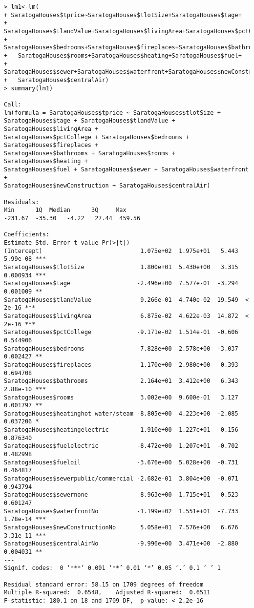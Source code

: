 \documentclass[12pt]{article}
\begin{document}
\begin{verbatim}
> lm1<-lm(
+ SaratogaHouses$tprice~SaratogaHouses$tlotSize+SaratogaHouses$tage+
+   SaratogaHouses$tlandValue+SaratogaHouses$livingArea+SaratogaHouses$pctCollege+
+   SaratogaHouses$bedrooms+SaratogaHouses$fireplaces+SaratogaHouses$bathrooms+
+   SaratogaHouses$rooms+SaratogaHouses$heating+SaratogaHouses$fuel+
+   SaratogaHouses$sewer+SaratogaHouses$waterfront+SaratogaHouses$newConstruction+
+   SaratogaHouses$centralAir)
> summary(lm1)

Call:
lm(formula = SaratogaHouses$tprice ~ SaratogaHouses$tlotSize + 
SaratogaHouses$tage + SaratogaHouses$tlandValue + SaratogaHouses$livingArea + 
SaratogaHouses$pctCollege + SaratogaHouses$bedrooms + SaratogaHouses$fireplaces + 
SaratogaHouses$bathrooms + SaratogaHouses$rooms + SaratogaHouses$heating + 
SaratogaHouses$fuel + SaratogaHouses$sewer + SaratogaHouses$waterfront + 
SaratogaHouses$newConstruction + SaratogaHouses$centralAir)

Residuals:
Min      1Q  Median      3Q     Max 
-231.67  -35.30   -4.22   27.44  459.56 

Coefficients:
Estimate Std. Error t value Pr(>|t|)    
(Intercept)                            1.075e+02  1.975e+01   5.443 5.99e-08 ***
SaratogaHouses$tlotSize                1.800e+01  5.430e+00   3.315 0.000934 ***
SaratogaHouses$tage                   -2.496e+00  7.577e-01  -3.294 0.001009 ** 
SaratogaHouses$tlandValue              9.266e-01  4.740e-02  19.549  < 2e-16 ***
SaratogaHouses$livingArea              6.875e-02  4.622e-03  14.872  < 2e-16 ***
SaratogaHouses$pctCollege             -9.171e-02  1.514e-01  -0.606 0.544906    
SaratogaHouses$bedrooms               -7.828e+00  2.578e+00  -3.037 0.002427 ** 
SaratogaHouses$fireplaces              1.170e+00  2.980e+00   0.393 0.694708    
SaratogaHouses$bathrooms               2.164e+01  3.412e+00   6.343 2.88e-10 ***
SaratogaHouses$rooms                   3.002e+00  9.600e-01   3.127 0.001797 ** 
SaratogaHouses$heatinghot water/steam -8.805e+00  4.223e+00  -2.085 0.037206 *  
SaratogaHouses$heatingelectric        -1.910e+00  1.227e+01  -0.156 0.876340    
SaratogaHouses$fuelelectric           -8.472e+00  1.207e+01  -0.702 0.482998    
SaratogaHouses$fueloil                -3.676e+00  5.028e+00  -0.731 0.464817    
SaratogaHouses$sewerpublic/commercial -2.682e-01  3.804e+00  -0.071 0.943794    
SaratogaHouses$sewernone              -8.963e+00  1.715e+01  -0.523 0.601247    
SaratogaHouses$waterfrontNo           -1.199e+02  1.551e+01  -7.733 1.78e-14 ***
SaratogaHouses$newConstructionNo       5.058e+01  7.576e+00   6.676 3.31e-11 ***
SaratogaHouses$centralAirNo           -9.996e+00  3.471e+00  -2.880 0.004031 ** 
---
Signif. codes:  0 ‘***’ 0.001 ‘**’ 0.01 ‘*’ 0.05 ‘.’ 0.1 ‘ ’ 1

Residual standard error: 58.15 on 1709 degrees of freedom
Multiple R-squared:  0.6548,	Adjusted R-squared:  0.6511 
F-statistic: 180.1 on 18 and 1709 DF,  p-value: < 2.2e-16

\end{verbatim}
\end{document}
